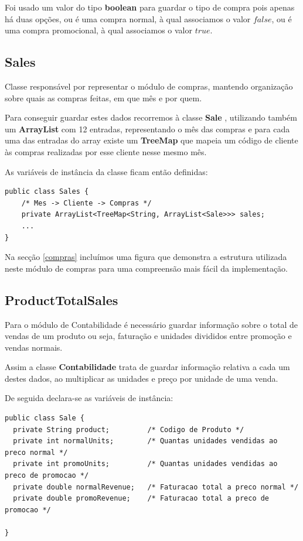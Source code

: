 \documentclass[10pt] {article}
\begin{document}
Foi usado um valor do tipo \color{blue} \textbf{boolean} \color{black} para guardar o tipo de compra pois apenas há duas 
opções, ou é uma compra normal, à qual associamos o valor $false$, ou é uma compra promocional, à qual associamos o valor 
$true$.

\subsection{Sales}
\par Classe responsável por representar o módulo de compras, mantendo organização sobre quais as compras feitas, em que 
mês e por quem. 
\par Para conseguir guardar estes dados recorremos à classe \color{blue} \textbf{Sale} \color{black}, utilizando também um 
\color{blue} \textbf{ArrayList} \color{black} com 12 entradas, representando o mês das compras e para cada uma das 
entradas do array existe um \color{blue} \textbf{TreeMap} \color{black} que mapeia um código de cliente às compras 
realizadas por esse cliente nesse mesmo mês.
\par As variáveis de instância da classe ficam então definidas:

\begin{lstlisting}
public class Sales {
	/* Mes -> Cliente -> Compras */
	private ArrayList<TreeMap<String, ArrayList<Sale>>> sales;
	...
}
\end{lstlisting}

\par Na secção \ref{compras} incluímos uma figura que demonstra a estrutura utilizada neste módulo de compras para uma 
compreensão mais fácil da implementação.

\subsection{ProductTotalSales}

Para o módulo de Contabilidade é necessário guardar informação sobre o total de vendas de um produto ou seja, faturação e unidades divididos entre promoção e vendas normais.

Assim a classe \textbf{Contabilidade} trata de guardar informação relativa a cada um destes dados, ao multiplicar as unidades e preço por unidade de uma venda.

De seguida declara-se as variáveis de instância:

\begin{lstlisting}
public class Sale {
  private String product;         /* Codigo de Produto */
  private int normalUnits;        /* Quantas unidades vendidas ao preco normal */
  private int promoUnits;         /* Quantas unidades vendidas ao preco de promocao */
  private double normalRevenue;   /* Faturacao total a preco normal */
  private double promoRevenue;    /* Faturacao total a preco de promocao */

}
\end{lstlisting}
\end{document}
